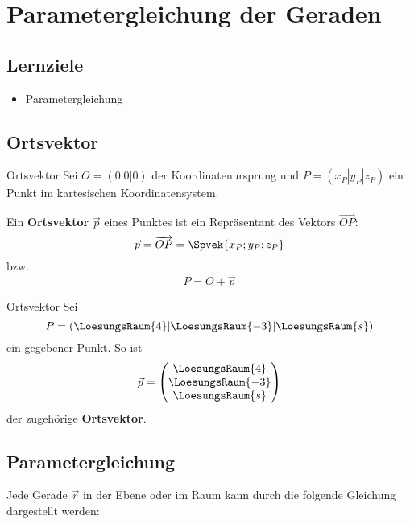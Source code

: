 \section{Parametergleichung der Geraden}

\subsection*{Lernziele}
\begin{itemize}
\item Parametergleichung
\end{itemize}

\newpage
\subsection{Ortsvektor}

\begin{definition}{Ortsvektor}{}
  Sei $O=(0|0|0)$ der Koordinatenursprung und $P=(x_P|y_P|z_P)$ ein Punkt im
  kartesischen Koordinatensystem.
  
  Ein \textbf{Ortsvektor} $\vec{p}$ eines Punktes
  ist ein Repräsentant des Vektors $\overrightarrow{OP}$:
  $$\vec{p} = \overrightarrow{OP}=\Spvek{x_P;y_P;z_P}$$
  bzw.
  $$P = O + \vec{p}$$
\end{definition}

\begin{beispiel}{Ortsvektor}{}
  Sei
  $$P=(\LoesungsRaum{4}|\LoesungsRaum{-3}|\LoesungsRaum{s})$$
  ein
gegebener Punkt. So ist
 $$\vec{p}
= \begin{pmatrix}\LoesungsRaum{4}\\\LoesungsRaum{-3}\\\LoesungsRaum{s}\end{pmatrix}$$
der zugehörige \textbf{Ortsvektor}.
\end{beispiel}

\newpage
\subsection{Parametergleichung}
Jede Gerade $\vec{r}$ in der Ebene oder im Raum kann durch die
folgende Gleichung dargestellt werden:

